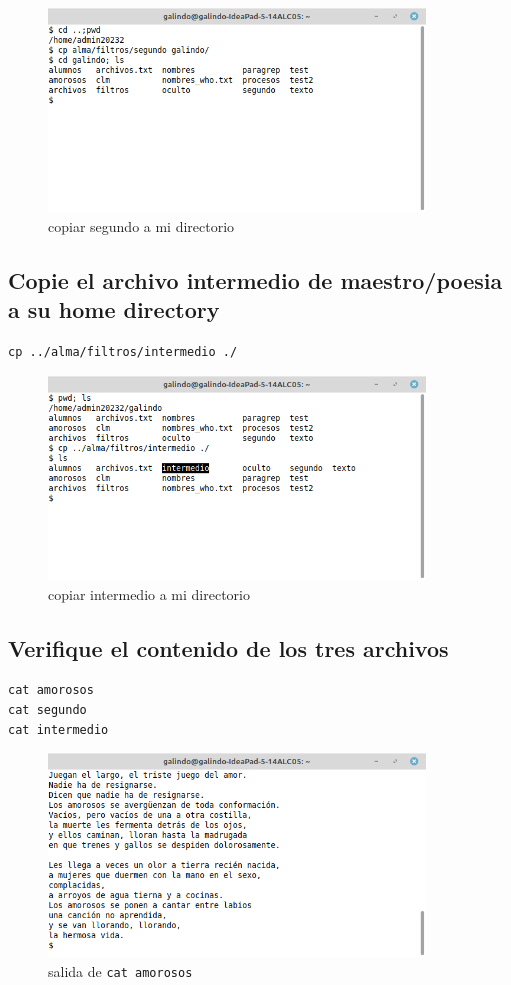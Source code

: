 \documentclass[11pt]{article}
\begin{document}
\begin{figure}[htbp]
\centering
\includegraphics[width=10cm]{img/a2.png}
\caption{copiar segundo a mi directorio}
\end{figure}

\pagebreak

\subsection{Copie el archivo intermedio de maestro/poesia a su home directory}
\label{sec:org760ff7d}
\begin{verbatim}
cp ../alma/filtros/intermedio ./
\end{verbatim}

\begin{figure}[htbp]
\centering
\includegraphics[width=10cm]{img/a3.png}
\caption{copiar intermedio a mi directorio}
\end{figure}

\subsection{Verifique el contenido de los tres archivos}
\label{sec:orgfa4a804}
\begin{verbatim}
cat amorosos
cat segundo
cat intermedio
\end{verbatim}

\begin{figure}[htbp]
\centering
\includegraphics[width=10cm]{img/amorosos.png}
\caption[\texttt{cat amorosos}]{salida de \texttt{cat amorosos}}
\end{figure}
\end{document}
